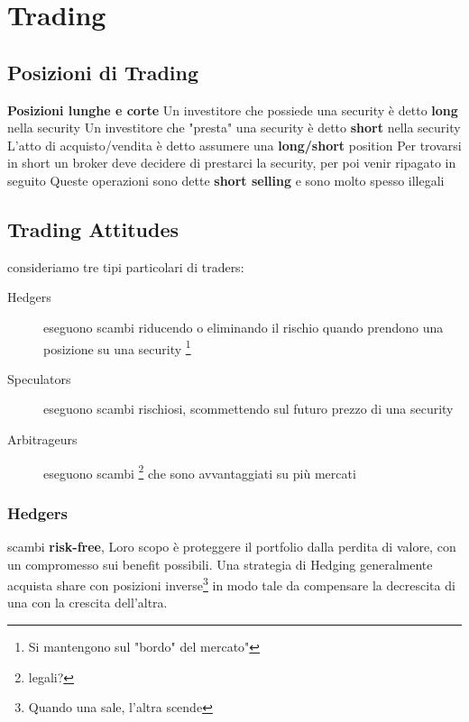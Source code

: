 \documentclass[a4paper,11pt]{report}
\begin{document}
{\newpage

\chapter{Trading}
\section{Posizioni di Trading}
	\textbf{Posizioni lunghe e corte}
	Un investitore che possiede una security è detto \textbf{long} nella security \newline
	Un investitore che "presta" una security è detto \textbf{short} nella security \newline
	L'atto di acquisto/vendita è detto assumere una \textbf{long/short} position  \newline
	Per trovarsi in short un broker deve decidere di prestarci la security, per poi venir ripagato in seguito \newline
	Queste operazioni sono dette \textbf{short selling} e sono molto spesso illegali

\newpage

\section{Trading Attitudes}
	consideriamo tre tipi particolari di traders:
\begin{description}
	\item[Hedgers] eseguono scambi riducendo o eliminando il rischio quando prendono una posizione su una security \footnote{ 		Si mantengono sul "bordo" del mercato"}
	\item[Speculators] eseguono scambi rischiosi, scommettendo sul futuro prezzo di una security
	\item[Arbitrageurs] eseguono scambi \footnote{legali?} che sono avvantaggiati su più mercati
\end{description}
\subsection{Hedgers}
	scambi \textbf{risk-free}, \newline
	Loro scopo è proteggere il portfolio dalla perdita di valore, con un compromesso sui benefit possibili.\newline
	Una strategia di Hedging generalmente acquista share con posizioni inverse\footnote{Quando una sale, l'altra scende} in 			modo tale da compensare la decrescita di una con la crescita dell'altra.
}
\end{document}
